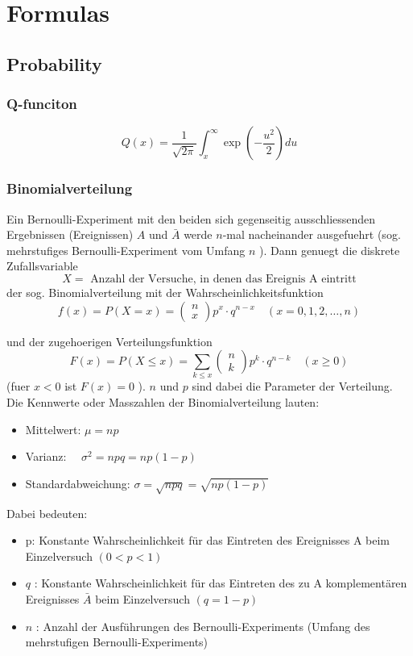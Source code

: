 \section{Formulas}
\subsection{Probability}
\subsubsection{Q-funciton}
\begin{equation}\label{q-funciton}
Q(x)=\frac{1}{\sqrt{2 \pi}} \int_x^{\infty} \exp \left(-\frac{u^2}{2}\right) d u
\end{equation}
\subsubsection{Binomialverteilung}
Ein Bernoulli-Experiment mit den beiden sich gegenseitig ausschliessenden Ergebnissen (Ereignissen) $A$ und $\bar{A}$ werde $n$-mal nacheinander ausgefuehrt (sog. mehrstufiges Bernoulli-Experiment vom Umfang $n$ ). Dann genuegt die diskrete Zufallsvariable
$$
    \text{$X=$ Anzahl der Versuche, in denen das Ereignis A eintritt}
$$
der sog. Binomialverteilung mit der Wahrscheinlichkeitsfunktion
\begin{equation}\label{eq:binomial_function}
    f(x)=P(X=x)=\left(\begin{array}{c}
    n \\
    x
    \end{array}\right) p^x \cdot q^{n-x} \quad(x=0,1,2, \ldots, n)
\end{equation}

und der zugehoerigen Verteilungsfunktion
$$
F(x)=P(X \leq x)=\sum_{k \leq x}\left(\begin{array}{l}
n \\
k
\end{array}\right) p^k \cdot q^{n-k} \quad(x \geq 0)
$$
(fuer $x<0$ ist $F(x)=0$ ). $n$ und $p$ sind dabei die Parameter der Verteilung. Die Kennwerte oder Masszahlen der Binomialverteilung lauten:
\begin{itemize}
    \item Mittelwert: $\mu=n p$
    \item Varianz: $\quad \sigma^2=n p q=n p(1-p)$
    \item Standardabweichung: $\sigma=\sqrt{n p q}=\sqrt{n p(1-p)}$
\end{itemize}
Dabei bedeuten:
\begin{itemize}
    \item p: Konstante Wahrscheinlichkeit für das Eintreten des Ereignisses A beim Einzelversuch $(0<p<1)$
    \item $q$ : Konstante Wahrscheinlichkeit für das Eintreten des zu A komplementären Ereignisses $\bar{A}$ beim Einzelversuch $(q=1-p)$
    \item $n$ : Anzahl der Ausführungen des Bernoulli-Experiments (Umfang des mehrstufigen Bernoulli-Experiments)
\end{itemize}
